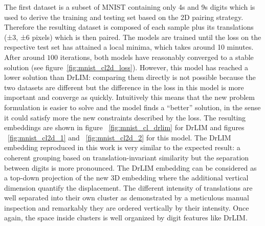 \documentclass[a4paper,12pt]{report}
\begin{document}
The first dataset is a subset of MNIST containing only 4s and 9s digits which is used to derive the training and testing set based on the 2D pairing strategy.
Therefore the resulting dataset is composed of each sample plus its translations (±3, ±6 pixels) which is then paired.
The models are trained until the loss on the respective test set has attained a local minima, which takes around 10 minutes.
After around $100$ iterations, both models have reasonably converged to a stable solution (see figure~\ref{fig:mnist_cl2d_loss}).
However, this model has reached a lower solution than DrLIM: comparing them directly is not possible because the two datasets are different but the difference in the loss in this model is more important and converge as quickly.
Intuitively this means that the new problem formulation is easier to solve and the model finds a ``better'' solution, in the sense it could satisfy more the new constraints described by the loss.
The resulting embeddings are shown in figure ~\ref{fig:mnist_cl_drlim} for DrLIM and figures ~\ref{fig:mnist_cl2d_1} and ~\ref{fig:mnist_cl2d_2} for this model.
The DrLIM embedding reproduced in this work is very similar to the expected result: a coherent grouping based on translation-invariant similarity but the separation between digits is more pronounced.
The DrLIM embedding can be considered as a top-down projection of the new 3D embedding where the additional vertical dimension quantify the displacement.
The different intensity of translations are well separated into their own cluster as demonstrated by a meticulous manual inspection and remarkably they are ordered vertically by their intensity.
Once again, the space inside clusters is well organized by digit features like DrLIM.
\end{document}
